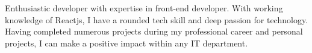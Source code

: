

\begin{cvparagraph}

Enthusiastic developer with expertise in front-end
developer. With working knowledge of Reactjs, I
have a rounded tech skill and deep passion for
technology. Having completed numerous projects
during my professional career and personal
projects, I can make a positive impact within any IT
department.
\end{cvparagraph}
